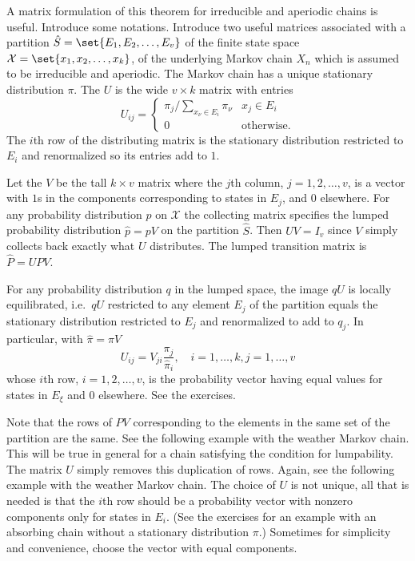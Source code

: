 \documentclass[12pt]{article}
\begin{document}
A matrix formulation of this theorem for irreducible and aperiodic
chains is useful.  Introduce some notations.  Introduce two useful
matrices associated with a partition \( \hat{S} = \set{E_1, E_2, \dots,
E_v} \) of the finite state space \( \mathcal{X} = \set{x_1, x_2, \dots,
x_k} \), of the underlying Markov chain \( X_n \) which is assumed to be
irreducible and aperiodic.  The Markov chain has a unique stationary
distribution \( \pi \).  The %
\( U \) is the wide \( v \times k \) matrix with entries
\[
    U_{ij} =
    \begin{cases}
        \pi_j/\sum_{x_{\nu} \in E_i} \pi_\nu & x_j \in E_i \\
        0 & \text{otherwise}.
    \end{cases}
\] The \( i \)th row of the distributing matrix is the stationary
distribution restricted to \( E_i \) and renormalized so its entries add
to \( 1 \).

Let the %
\( V \) be the tall \( k \times v \) matrix where the \( j \)th column, \(
j = 1, 2, \dots, v \), is a vector with \( 1 \)s in the components
corresponding to states in \( E_j \), and \( 0 \) elsewhere.  For any
probability distribution \( p \) on \( \mathcal{X} \) the collecting
matrix specifies the lumped probability distribution \( \hat{p} = p V \)
on the partition \( \hat{S} \).  Then \( UV = I_v \) since \( V \)
simply collects back exactly what \( U \) distributes.  The lumped
transition matrix is \( \hat{P} = UPV \).

For any probability distribution \( q \) in the lumped space, the image \(
qU \) is locally equilibrated, i.e.\ \( qU \) restricted to any element \(
E_j \) of the partition equals the stationary distribution restricted to
\( E_j \) and renormalized to add to \( q_j \).  In particular, with \(
\hat{\pi} = \pi V \)
\[
    U_{ij} = V_{ji} \frac{\pi_j}{\hat{\pi}_{i}}, \quad i = 1, \dots, k,
    j = 1, \dots, v
\] whose \( i \)th row, \( i = 1, 2, \dots, v \), is the probability
vector having equal values for states in \( E_{\xi} \) and \( 0 \)
elsewhere.  See the exercises.

Note that the rows of \( PV \) corresponding to the elements in the same
set of the partition are the same.  See the following example with the
weather Markov chain.  This will be true in general for a chain
satisfying the condition for lumpability.  The matrix \( U \) simply
removes this duplication of rows.  Again, see the following example with
the weather Markov chain.  The choice of \( U \) is not unique, all that
is needed is that the \( i \)th row should be a probability vector with
nonzero components only for states in \( E_i \).  (See the exercises for
an example with an absorbing chain without a stationary distribution \(
\pi \).) Sometimes for simplicity and convenience, choose the vector
with equal components.
\end{document}
